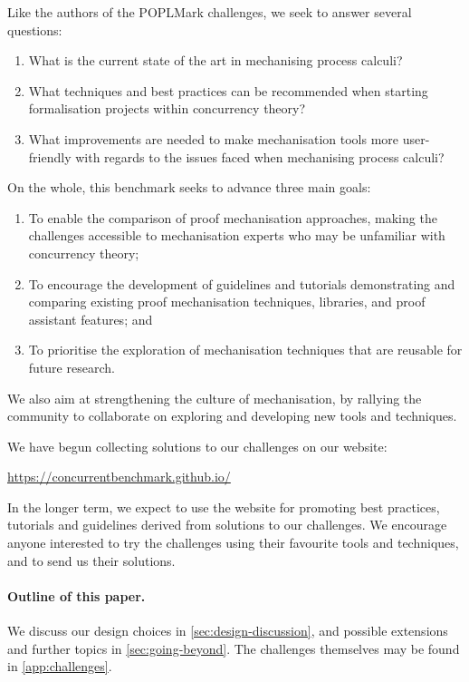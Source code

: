 \documentclass[runningheads]{llncs}
\begin{document}
Like the authors of the POPLMark challenges, we seek to
answer several questions:
\begin{enumerate}[label=\textbf{(Q\arabic*)},leftmargin=10mm]
\item\label{item:rq1} What is the current state of the art in mechanising process calculi?
\item\label{item:rq2} What techniques and best practices can be recommended when starting formalisation projects within concurrency theory?
\item\label{item:rq3} What improvements are needed to make mechanisation tools more user-friendly with regards to the issues faced when mechanising process calculi?
\end{enumerate}

On the whole, this benchmark seeks to advance three main goals:

\begin{enumerate}[label=\textbf{(G\arabic*)},leftmargin=10mm]
\item\label{item:goal-comperison-accessibility} To enable the comparison of
  proof mechanisation approaches, making the challenges accessible to
  mechanisation experts who may be unfamiliar with concurrency theory;

\item\label{item:goal-tutorials} To encourage the development of guidelines and
  tutorials demonstrating and comparing existing proof mechanisation
  techniques, libraries, and proof assistant features; and

\item\label{item:goal-reusability} To prioritise the exploration of mechanisation
  techniques that are reusable for future research.
\end{enumerate}
We also aim at strengthening the culture of mechanisation, by rallying the
community to collaborate on exploring and developing new tools and techniques.

We have begun collecting solutions to our challenges on our website:
%
\begin{center}
  \url{https://concurrentbenchmark.github.io/}
\end{center}
%
In the longer term, we expect to use the website for promoting best practices,
tutorials and guidelines derived from solutions to our challenges.
We encourage anyone interested to try the challenges using their
favourite tools and techniques, and to send us their solutions.

\paragraph{Outline of this paper.}
We discuss our design choices in \cref{sec:design-discussion}, and possible extensions and further topics in \cref{sec:going-beyond}.
The challenges themselves may be found in \cref{app:challenges}.
\end{document}
